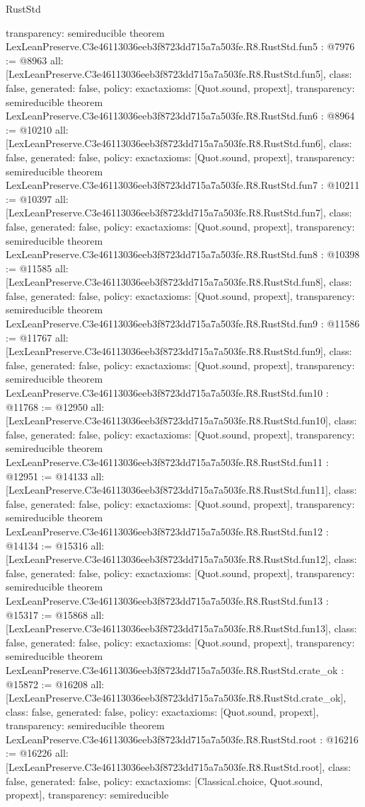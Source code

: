 \begin{lexlean}{RustStd}
\begin{coremodule}
{  transparency: semireducible
}
theorem LexLeanPreserve.C3e46113036eeb3f8723dd715a7a503fe.R8.RustStd.fun5 : @7976 := @8963 {
  all: [LexLeanPreserve.C3e46113036eeb3f8723dd715a7a503fe.R8.RustStd.fun5],
  class: false,
  generated: false,
  policy: exact{axioms: [Quot.sound, propext]},
  transparency: semireducible
}
theorem LexLeanPreserve.C3e46113036eeb3f8723dd715a7a503fe.R8.RustStd.fun6 : @8964 := @10210 {
  all: [LexLeanPreserve.C3e46113036eeb3f8723dd715a7a503fe.R8.RustStd.fun6],
  class: false,
  generated: false,
  policy: exact{axioms: [Quot.sound, propext]},
  transparency: semireducible
}
theorem LexLeanPreserve.C3e46113036eeb3f8723dd715a7a503fe.R8.RustStd.fun7 : @10211 := @10397 {
  all: [LexLeanPreserve.C3e46113036eeb3f8723dd715a7a503fe.R8.RustStd.fun7],
  class: false,
  generated: false,
  policy: exact{axioms: [Quot.sound, propext]},
  transparency: semireducible
}
theorem LexLeanPreserve.C3e46113036eeb3f8723dd715a7a503fe.R8.RustStd.fun8 : @10398 := @11585 {
  all: [LexLeanPreserve.C3e46113036eeb3f8723dd715a7a503fe.R8.RustStd.fun8],
  class: false,
  generated: false,
  policy: exact{axioms: [Quot.sound, propext]},
  transparency: semireducible
}
theorem LexLeanPreserve.C3e46113036eeb3f8723dd715a7a503fe.R8.RustStd.fun9 : @11586 := @11767 {
  all: [LexLeanPreserve.C3e46113036eeb3f8723dd715a7a503fe.R8.RustStd.fun9],
  class: false,
  generated: false,
  policy: exact{axioms: [Quot.sound, propext]},
  transparency: semireducible
}
theorem LexLeanPreserve.C3e46113036eeb3f8723dd715a7a503fe.R8.RustStd.fun10 : @11768 := @12950 {
  all: [LexLeanPreserve.C3e46113036eeb3f8723dd715a7a503fe.R8.RustStd.fun10],
  class: false,
  generated: false,
  policy: exact{axioms: [Quot.sound, propext]},
  transparency: semireducible
}
theorem LexLeanPreserve.C3e46113036eeb3f8723dd715a7a503fe.R8.RustStd.fun11 : @12951 := @14133 {
  all: [LexLeanPreserve.C3e46113036eeb3f8723dd715a7a503fe.R8.RustStd.fun11],
  class: false,
  generated: false,
  policy: exact{axioms: [Quot.sound, propext]},
  transparency: semireducible
}
theorem LexLeanPreserve.C3e46113036eeb3f8723dd715a7a503fe.R8.RustStd.fun12 : @14134 := @15316 {
  all: [LexLeanPreserve.C3e46113036eeb3f8723dd715a7a503fe.R8.RustStd.fun12],
  class: false,
  generated: false,
  policy: exact{axioms: [Quot.sound, propext]},
  transparency: semireducible
}
theorem LexLeanPreserve.C3e46113036eeb3f8723dd715a7a503fe.R8.RustStd.fun13 : @15317 := @15868 {
  all: [LexLeanPreserve.C3e46113036eeb3f8723dd715a7a503fe.R8.RustStd.fun13],
  class: false,
  generated: false,
  policy: exact{axioms: [Quot.sound, propext]},
  transparency: semireducible
}
theorem LexLeanPreserve.C3e46113036eeb3f8723dd715a7a503fe.R8.RustStd.crate_ok : @15872 := @16208 {
  all: [LexLeanPreserve.C3e46113036eeb3f8723dd715a7a503fe.R8.RustStd.crate_ok],
  class: false,
  generated: false,
  policy: exact{axioms: [Quot.sound, propext]},
  transparency: semireducible
}
theorem LexLeanPreserve.C3e46113036eeb3f8723dd715a7a503fe.R8.RustStd.root : @16216 := @16226 {
  all: [LexLeanPreserve.C3e46113036eeb3f8723dd715a7a503fe.R8.RustStd.root],
  class: false,
  generated: false,
  policy: exact{axioms: [Classical.choice, Quot.sound, propext]},
  transparency: semireducible
}


\end{coremodule}
\end{lexlean}
